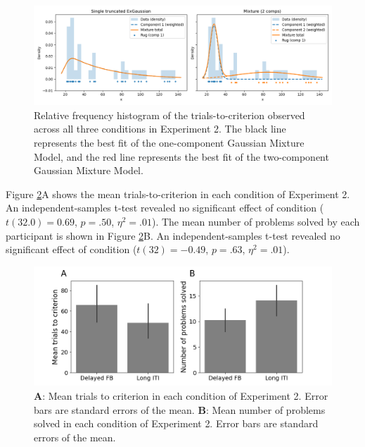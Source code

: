 \documentclass[doc, floatsintext]{apa7}
\begin{document}
\begin{figure}
  \centering
  \includegraphics[width=.8\textwidth]{../figures/fig_exp_2_mm_trunc_exgauss_compare.png}
  \caption{
      Relative frequency histogram of the
      trials-to-criterion observed across all three
      conditions in Experiment 2. The black line represents
      the best fit of the one-component Gaussian Mixture
      Model, and the red line represents the best fit of the
      two-component Gaussian Mixture Model.
}
  \label{fig_mm_hist_2}
\end{figure}

Figure \ref{fig_exp_2_t2c}A shows the mean
trials-to-criterion in each condition of Experiment 2. An
independent-samples t-test revealed no significant effect of
condition ($t(32.0)=0.69$, $p = .50$, $\eta^2 = .01$).  The
mean number of problems solved by each participant is shown
in Figure \ref{fig_exp_2_t2c}B. An independent-samples
t-test revealed no significant effect of condition ($t(32) =
-0.49$, $p = .63$, $\eta^2 = .01$).

\begin{figure}
  \centering
  \includegraphics[width=.8\textwidth]{../figures/fig_exp_2_t2c.png}
    \caption{
        \textbf{A}: Mean trials to criterion in each
        condition of Experiment 2. Error bars are standard
        errors of the mean.
        \textbf{B}: Mean number of problems solved in each
        condition of Experiment 2. Error bars are standard
        errors of the mean.
}
  \label{fig_exp_2_t2c}
\end{figure}
\end{document}
